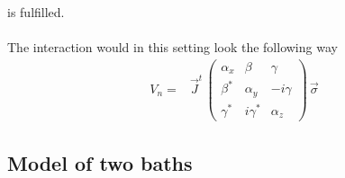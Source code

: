 \documentclass{article}
\begin{document}
is fulfilled.\\\\
The interaction would in this setting look the following way
\begin{align*}
    V_n =& \vec{J}^t\,\left(\begin{array}{ccc}
         \alpha_x&\beta&\gamma  \\
         \beta^*&\alpha_y&-i\gamma\\
         \gamma^*&i\gamma^*&\alpha_z
    \end{array}\right)\,\vec{\sigma}
\end{align*}

\subsection*{Model of two baths}
\end{document}
